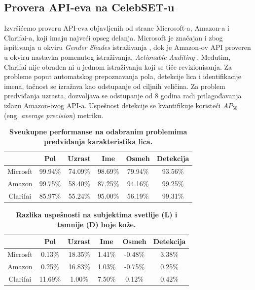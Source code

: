\documentclass[11pt, a4paper]{article}
\begin{document}
\subsection{Provera API-eva na CelebSET-u}
Izvršićemo proveru API-eva objavljenih od strane Microsoft-a, Amazon-a i Clarifai-a, koji imaju najveći opseg delanja. Microsoft je značajan i zbog ispitivanja u okviru \textit{Gender Shades} istraživanja \cite{G6}, dok je Amazon-ov API proveren u okviru nastavka pomenutog istraživanja, \textit{Actionable Auditing} \cite{G39}. Međutim, Clarifai nije obrađen ni u jednom istraživanju koji se tiče revizionisanja. Za probleme poput automatskog prepoznavanja pola, detekcije lica i identifikacije imena, tačnost se izražava kao odstupanje od ciljnih veličina. Za problem predviđanja uzrasta, dozvoljava se odstupanje od 8 godina radi prilagođavanja izlazu Amazon-ovog API-a. Uspešnost detekcije se kvantifikuje koristeći $AP_{50}$ (eng. \textit{average precision}) metriku.

\begin{table}[h!]
	\centering
	\caption{\textbf{Sveukupne performanse na odabranim problemima predviđanja karakteristika lica.}}
	\begin{tabular}{c|ccccc} \toprule
		{} & {Pol} & {Uzrast} & {Ime} & {Osmeh} & {Detekcija} \\ \midrule
		{Microsft} & 99.94\% & 74.09\% & 98.69\% & 79.94\% & 93.56\% \\ 
		{Amazon} & 99.75\% & 58.40\% & 87.25\% & 94.16\% & 99.25\% \\
		{Clarifai} & 85.97\% & 55.24\% & 95.00\% & 56.19\% & 99.31\%\\ \bottomrule
	\end{tabular}
	\label{table:overall}
\end{table}

\begin{table}[h!]
	\centering
	\caption{\textbf{Razlika uspešnosti na subjektima svetlije (L) i tamnije (D) boje kože.}}
	\begin{tabular}{c|ccccc} \toprule
		{} & {Pol} & {Uzrast} & {Ime} & {Osmeh} & {Detekcija} \\ \midrule
		{Microsft} & 0.13\% & 18.35\% & 1.41\% & -0.48\% & 3.38\% \\ 
		{Amazon} & 0.25\% & 16.83\% & 1.03\% & -0.75\% & 0.25\% \\
		{Clarifai} & 11.69\% & 1.00\% & 7.50\% & 0.12\% & 0.42\%\\ \bottomrule
	\end{tabular}
	\label{table:unitary-color}
\end{table}
\end{document}
